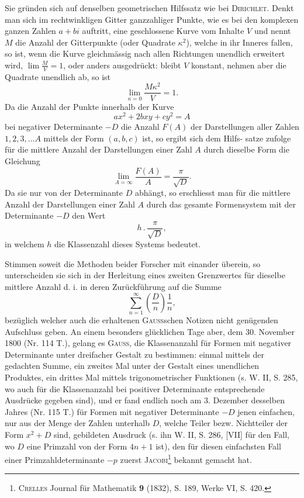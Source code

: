 Sie gründen sich auf denselben geometrischen Hilfssatz wie bei \textsc{Dirichlet}. Denkt man sich im rechtwinkligen Gitter ganzzahliger Punkte, wie es bei den komplexen ganzen Zahlen \(a+bi\) auftritt, eine geschlossene Kurve vom Inhalte \(V\) und nennt \(M\) die Anzahl der Gitterpunkte (oder Quadrate \(\kappa^2\)), welche in ihr Inneres fallen, so ist, wenn die Kurve gleichmässig nach allen Richtungen unendlich erweitert wird, \(\lim\frac MV=1\), oder anders ausgedrückt: bleibt \(V\) konstant, nehmen aber die Quadrate unendlich ab, so ist
\[
\lim_{\kappa=0}\frac{M\kappa^2}{V}=1.
\]
Da die Anzahl der Punkte innerhalb der Kurve
\[
ax^2+2bxy+cy^2=A
\]
bei negativer Determinante \(-D\) die Anzahl \(F(A)\) der Darstellungen aller Zahlen \(1,2,3,\ldots A\) mittels der Form \((a,b,c)\) ist, so ergibt sich dem Hilfs-
\newpage{}
\noindent satze zufolge für die mittlere Anzahl der Darstellungen einer Zahl \(A\) durch dieselbe Form die Gleichung
\[
\lim_{A=\infty}\frac{F(A)}A=\frac\pi{\sqrt D}.
\]
Da sie nur von der Determinante \(D\) abhängt, so erschliesst man für die mittlere Anzahl der Darstellungen einer Zahl \(A\) durch das gesamte Formensystem mit der Determinante \(-D\) den Wert
\[
h\mathbin{.}\frac\pi{\sqrt D},
\]
in welchem \(h\) die Klassenzahl dieses Systems bedeutet.

Stimmen soweit die Methoden beider Forscher mit einander überein, so unterscheiden sie sich in der Herleitung eines zweiten Grenzwertes für dieselbe mittlere Anzahl d. i. in deren Zurückführung auf die Summe
\[
\sum_{n=1}^{\infty}\left(\frac Dn\right)\frac1n,
\]
bezüglich welcher auch die erhaltenen \textsc{Gauss}schen Notizen nicht genügenden Aufschluss geben. An einem besonders glücklichen Tage aber, dem 30. November 1800 (Nr. 114 T.), gelang es \textsc{Gauss}, die Klassenanzahl für Formen mit negativer Determinante unter dreifacher Gestalt zu bestimmen: einmal mittels der gedachten Summe, ein zweites Mal unter der Gestalt eines unendlichen Produktes, ein drittes Mal mittels trigonometrischer Funktionen (s. W. II, S. 285, wo auch für die Klassenanzahl bei positiver Determinante entsprechende Ausdrücke gegeben sind), und er fand endlich noch am 3. Dezember desselben Jahres (Nr. 115 T.) für Formen mit negativer Determinante \(-D\) jenen einfachen, nur aus der Menge der Zahlen unterhalb \(D\), welche Teiler bezw. Nichtteiler der Form \(x^2+D\) sind, gebildeten Ausdruck (s. ihn W. II, S. 286, [VII] für den Fall, wo \(D\) eine Primzahl von der Form \(4n+1\) ist), den für diesen einfachsten Fall einer Primzahldeterminante \(-p\) zuerst \textsc{Jacobi}\footnote{\textsc{Crelles} Journal für Mathematik \textbf{9} (1832), S. 189, Werke VI, S. 420.} bekannt gemacht hat.

